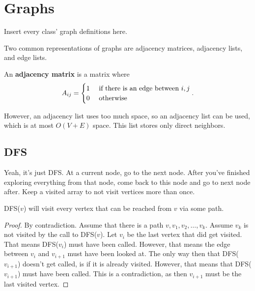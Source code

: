 
\section{Graphs}

Insert every class' graph definitions here.

Two common representations of graphs are adjacency matrices, adjacency lists, and edge lists.

\begin{definition}
	An \textbf{adjacency matrix} is a matrix where \[
		A_{ij} = \begin{cases}
			1 &\text{ if there is an edge between \( i,j \)}\\
			0 &\text{ otherwise}
		\end{cases}
	.\] 
\end{definition}

However, an adjacency list uses too much space, so an adjacency list can be used, which is at most \( O(V + E) \) space. This list stores only direct neighbors.

\subsection{DFS}

Yeah, it's just DFS. At a current node, go to the next node. After you've finished exploring everything from that node, come back to this node and go to next node after. Keep a visited array to not visit vertices more than once.

\begin{lemma}
	DFS(\( v \)) will visit every vertex that can be reached from \( v \) via some path.
\end{lemma}
\begin{proof}
	By contradiction. Assume that there is a path \( v, v_{1}, v_{2}, \ldots , v_k \). Assume \( v_k \) is not visited by the call to DFS(\( v \)). Let \( v_i \) be the last vertex that did get visited. That means DFS(\( v_i \)) must have been called. However, that means the edge between \( v_{i} \) and \( v_{i+1} \) must have been looked at. The only way then that DFS(\( v_{i+1} \)) doesn't get called, is if it is already visited. However, that means that DFS(\( v_{i+1} \)) must have been called. This is a contradiction, as then \( v_{i+1} \) must be the last visited vertex.
\end{proof}


